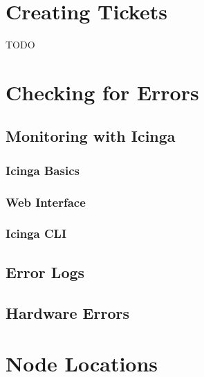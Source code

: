 \documentclass[10pt,letterpaper]{article}
\begin{document}
\section{Creating Tickets}
    TODO
\clearpage

\section{Checking for Errors}
    \subsection{Monitoring with Icinga}
        \subsubsection{Icinga Basics}
        \subsubsection{Web Interface}
        \subsubsection{Icinga CLI}
    \subsection{Error Logs}
    \subsection{Hardware Errors}
\clearpage


\appendix
\section{Node Locations}
\end{document}
